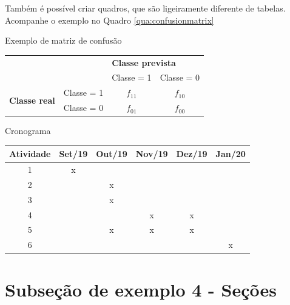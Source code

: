Também é possível criar quadros, que são ligeiramente diferente de tabelas. Acompanhe o exemplo no Quadro \ref{qua:confusionmatrix}

\begin{quadro}
	\centering
	\caption{\label{qua:confusionmatrix}Exemplo de matriz de confusão}
	\begin{tabular}{ll|c|c|}
		\cline{3-4}
		\multicolumn{1}{c}{\textbf{}} & \multicolumn{1}{c|}{\textbf{}} & \multicolumn{2}{l|}{\textbf{Classe prevista}} \\ \cline{3-4}
		 & \multicolumn{1}{c|}{\textbf{}} & Classe = 1 & Classe = 0 \\ \hline
		\multicolumn{1}{|l|}{\multirow{2}{*}{\textbf{Classe real}}} & Classe = 1 & $f_{11}$ & $f_{10}$ \\ \cline{2-4}
		\multicolumn{1}{|l|}{} & Classe = 0 & $f_{01}$ & $f_{00}$ \\ \hline
	\end{tabular}
	\Ididthis
\end{quadro}


\begin{quadro}
	\caption{\label{qua:cron}Cronograma}
	\center
	\begin{tabular}{|c|c|c|c|c|c|}
	\hline
	\multicolumn{1}{|l|}{Atividade} & \multicolumn{1}{l|}{Set/19} & \multicolumn{1}{l|}{Out/19} & \multicolumn{1}{l|}{Nov/19} & \multicolumn{1}{l|}{Dez/19} & \multicolumn{1}{l|}{Jan/20} \\ \hline
	1                               & x                           &                             &                             &                             &                             \\ \hline
	2                               &                             & x                           &                             &                             &                             \\ \hline
	3                               &                             & x                           &                             &                             &                             \\ \hline
	4                               &                             &                             & x                           & x                           &                             \\ \hline
	5                               &                             & x                           & x                           & x                           &                             \\ \hline
	6                               &                             &                             &                             &                             & x                           \\ \hline
	
	\end{tabular}
	\end{quadro}

\section{Subseção de exemplo 4 - Seções}
